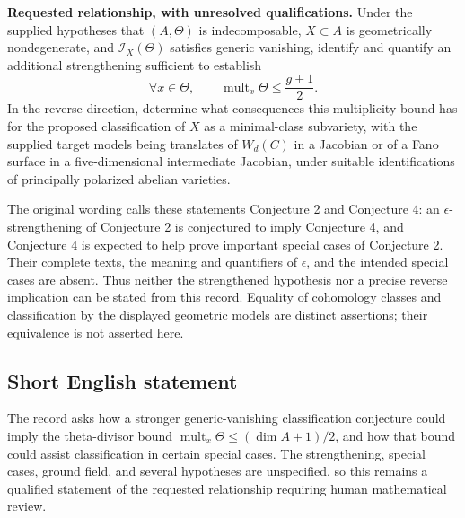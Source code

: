 \documentclass[11pt]{article}
\begin{document}
\textbf{Requested relationship, with unresolved qualifications.} Under the supplied hypotheses that \((A,\Theta)\) is indecomposable, \(X\subset A\) is geometrically nondegenerate, and \(\mathcal I_X(\Theta)\) satisfies generic vanishing, identify and quantify an additional strengthening sufficient to establish
\[
\forall x\in\Theta,\qquad \operatorname{mult}_{x}\Theta\le\frac{g+1}{2}.
\]
In the reverse direction, determine what consequences this multiplicity bound has for the proposed classification of \(X\) as a minimal-class subvariety, with the supplied target models being translates of \(W_d(C)\) in a Jacobian or of a Fano surface in a five-dimensional intermediate Jacobian, under suitable identifications of principally polarized abelian varieties.

The original wording calls these statements Conjecture 2 and Conjecture 4: an \(\epsilon\)-strengthening of Conjecture 2 is conjectured to imply Conjecture 4, and Conjecture 4 is expected to help prove important special cases of Conjecture 2. Their complete texts, the meaning and quantifiers of \(\epsilon\), and the intended special cases are absent. Thus neither the strengthened hypothesis nor a precise reverse implication can be stated from this record. Equality of cohomology classes and classification by the displayed geometric models are distinct assertions; their equivalence is not asserted here.
\subsection{Short English statement}
The record asks how a stronger generic-vanishing classification conjecture could imply the theta-divisor bound \(\operatorname{mult}_x\Theta\le(\dim A+1)/2\), and how that bound could assist classification in certain special cases. The strengthening, special cases, ground field, and several hypotheses are unspecified, so this remains a qualified statement of the requested relationship requiring human mathematical review.
\end{document}
